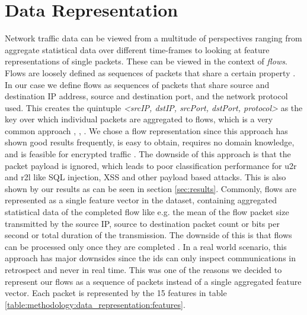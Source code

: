\section{Data Representation}

Network traffic data can be viewed from a multitude of perspectives ranging from aggregate statistical data over different time-frames \cite{kitsune} to looking at feature representations of single packets. These can be viewed in the context of \textit{flows}.
Flows are loosely defined as sequences of packets that share a certain property \cite{adversarial_recurrent_ids}. In our case we define flows as sequences of packets that share source and destination IP address, source and destination port, and the network protocol used. This creates the quintuple \textit{<srcIP, dstIP, srcPort, dstPort, protocol>} as the key over which individual packets are aggregated to flows, which is a very common approach \cite{caia_vector}, \cite{unsw_nb15}, \cite{feature_vectors}. We chose a flow representation since this approach has shown good results frequently, is easy to obtain, requires no domain knowledge, and is feasible for encrypted traffic \cite{feature_vectors}. The downside of this approach is that the packet payload is ignored, which leads to poor classification performance for \gls{u2r} and \gls{r2l} \cite{nsl_kdd} like SQL injection, XSS and other payload based attacks. This is also shown by our results as can be seen in section \ref{sec:results}.
Commonly, flows are represented as a single feature vector in the dataset, containing aggregated statistical data of the completed flow like e.g. the mean of the flow packet size transmitted by the source IP, source to destination packet count or bits per second or total duration of the transmission. The downside of this is that flows can be processed only once they are completed \cite{adversarial_recurrent_ids}. In a real world scenario, this approach has major downsides since the \gls{ids} can only inspect communications in retrospect and never in real time. This was one of the reasons we decided to represent our flows as a sequence of packets instead of a single aggregated feature vector. Each packet is represented by the 15 features in table \ref{table:methodology:data_representation:features}.

